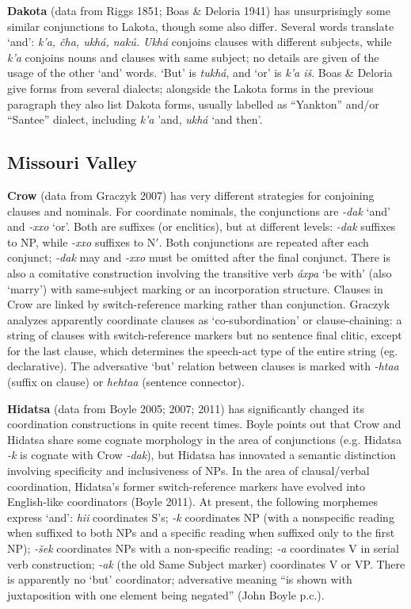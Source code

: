 \documentclass[output=paper]{LSP/langsci}
\begin{document}
\textbf{Dakota} (data from Riggs 1851; Boas \& Deloria 1941) has unsurprisingly some similar conjunctions to Lakota, though some also differ. Several words translate `and': \textit{k'a, \v{c}ha, ukh\'a, nak\'u. Ukh\'a} conjoins clauses with different subjects, while \textit{k'a} conjoins nouns and clauses with same subject; no details are given of the usage of the other `and' words. `But' is \textit{tukh\'a}, and `or' is \textit{k'a i\v{s}}. Boas \& Deloria give forms from several dialects; alongside the Lakota forms in the previous paragraph they also list Dakota forms, usually labelled as ``Yankton'' and/or ``Santee'' dialect, including \textit{k'a} 'and, \textit{ukh\'a} `and then'.     

\subsection{Missouri Valley}
 
\textbf{Crow} (data from Graczyk 2007) has very different strategies for conjoining clauses and
nominals. For coordinate nominals, the conjunctions are \textit{-dak} `and' and \textit{-xxo} `or'. Both are suffixes (or enclitics), but at different levels: \textit{-dak} suffixes to NP, while \textit{-xxo} suffixes to N$'$. Both conjunctions are repeated after each conjunct; \textit{-dak} may and \textit{-xxo} must be omitted after the final conjunct. There is also a comitative construction involving the transitive verb \textit{\'axpa} `be with' (also `marry') with same-subject marking or an incorporation structure. Clauses in Crow are linked by switch-reference marking rather than conjunction. Graczyk analyzes apparently coordinate clauses as `co-subordination' or clause-chaining: a string of clauses with switch-reference markers but no sentence final clitic, except for the last clause, which determines the speech-act type of the entire string (eg. declarative). The adversative `but' relation between clauses is marked with \textit{-htaa} (suffix on clause) or \textit{hehtaa} (sentence connector).

\textbf{Hidatsa} (data from Boyle 2005; 2007; 2011) has significantly changed its coordination constructions in quite recent times. Boyle points out that Crow and Hidatsa share some cognate morphology in the area of conjunctions (e.g. Hidatsa \textit{-k} is cognate with Crow \textit{-dak}), but Hidatsa has innovated a semantic distinction involving specificity and inclusiveness of NPs. In the area of clausal/verbal coordination, Hidatsa's former switch-reference markers have evolved into English-like coordinators (Boyle 2011). At present, the following morphemes express `and': \textit{hii} coordinates S's; \textit{-k} coordinates NP (with a nonspecific reading when suffixed to both NPs and a specific reading when suffixed only to the first NP); \textit{-\v{s}ek} coordinates NPs with a non-specific reading; \textit{-a} coordinates V in serial verb construction; \textit{-ak} (the old Same Subject marker) coordinates V or VP. There is apparently no `but' coordinator; adversative meaning ``is shown with juxtaposition with one element being negated'' (John Boyle p.c.).
\end{document}

